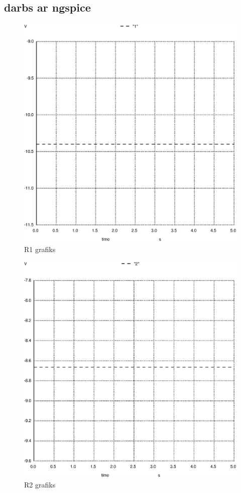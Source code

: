 \documentclass{report}
\begin{document}
\subsection{darbs ar ngspice}
 \begin{figure}[!htb]
    \centering
        \includegraphics[scale=0.45]{011.ps}
        \caption{R1 grafiks}
        \label{fig:my_label}
    \end{figure} \newpage
    
     \begin{figure}[!htb]
    \centering
        \includegraphics[scale=0.45]{012.ps}
        \caption{R2 grafiks}
        \label{fig:my_label}
    \end{figure} \newpage
\end{document}
